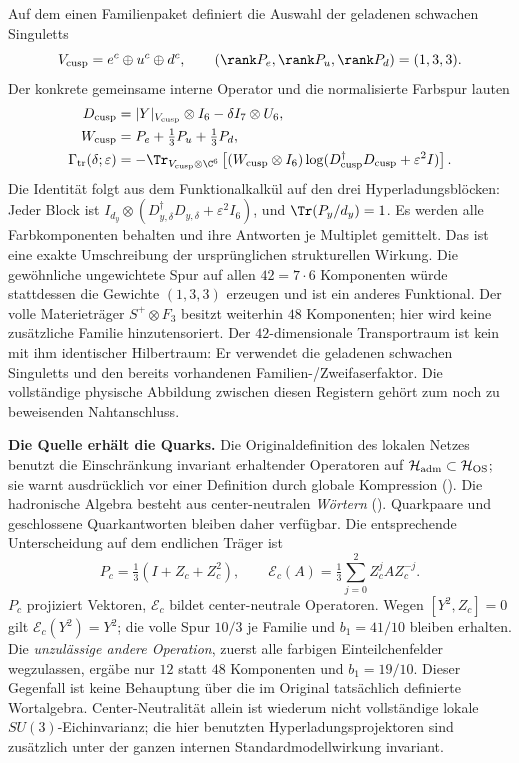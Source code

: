 Auf dem einen Familienpaket definiert die Auswahl der geladenen schwachen Singuletts
\[
V_{\rm cusp}=e^c\oplus u^c\oplus d^c,\qquad
(\rank P_e,\rank P_u,\rank P_d)=(1,3,3).
\]
Der konkrete gemeinsame interne Operator und die normalisierte Farbspur lauten
\begin{align}
D_{\rm cusp}&=|Y|_{V_{\rm cusp}}\otimes I_6-\delta I_7\otimes U_6,\\
W_{\rm cusp}&=P_e+\tfrac13P_u+\tfrac13P_d,\\
\Gamma_{\rm tr}(\delta;\varepsilon)
&=-\Tr_{V_{\rm cusp}\otimes\C^6}
\left[(W_{\rm cusp}\otimes I_6)
\log(D_{\rm cusp}^{\dagger}D_{\rm cusp}+\varepsilon^2I)\right].
\end{align}
Die Identität folgt aus dem Funktionalkalkül auf den drei Hyperladungsblöcken:
Jeder Block ist $I_{d_y}\otimes(D_{y,\delta}^{\dagger}D_{y,\delta}+\varepsilon^2I_6)$,
und $\Tr(P_y/d_y)=1$. Es werden alle Farbkomponenten behalten und ihre Antworten je Multiplet gemittelt.
Das ist eine exakte Umschreibung der ursprünglichen strukturellen Wirkung.
Die gewöhnliche ungewichtete Spur auf allen $42=7\cdot6$ Komponenten würde stattdessen die Gewichte $(1,3,3)$ erzeugen und ist ein anderes Funktional.
Der volle Materieträger $S^+\otimes F_3$ besitzt weiterhin $48$ Komponenten; hier wird keine zusätzliche Familie hinzutensoriert. Der $42$-dimensionale Transportraum ist kein mit ihm identischer Hilbertraum: Er verwendet die geladenen schwachen Singuletts und den bereits vorhandenen Familien-/Zweifaserfaktor. Die vollständige physische Abbildung zwischen diesen Registern gehört zum noch zu beweisenden Nahtanschluss.

\textbf{Die Quelle erhält die Quarks.} Die Originaldefinition des lokalen Netzes benutzt die Einschränkung invariant erhaltender Operatoren auf $\mathcal H_{\rm adm}\subset\mathcal H_{\rm OS}$; sie warnt ausdrücklich vor einer Definition durch globale Kompression
(). Die hadronische Algebra besteht aus center-neutralen \emph{Wörtern}
(). Quarkpaare und geschlossene Quarkantworten bleiben daher verfügbar.
Die entsprechende Unterscheidung auf dem endlichen Träger ist
\[
P_c=\tfrac13(I+Z_c+Z_c^2),\qquad
\mathcal E_c(A)=\tfrac13\sum_{j=0}^2 Z_c^j A Z_c^{-j}.
\]
$P_c$ projiziert Vektoren, $\mathcal E_c$ bildet center-neutrale Operatoren.
Wegen $[Y^2,Z_c]=0$ gilt $\mathcal E_c(Y^2)=Y^2$; die volle Spur $10/3$ je Familie und $b_1=41/10$ bleiben erhalten.
Die \emph{unzulässige andere Operation}, zuerst alle farbigen Einteilchenfelder wegzulassen, ergäbe nur $12$ statt $48$ Komponenten und $b_1=19/10$. Dieser Gegenfall ist keine Behauptung über die im Original tatsächlich definierte Wortalgebra.
Center-Neutralität allein ist wiederum nicht vollständige lokale $SU(3)$-Eichinvarianz; die hier benutzten Hyperladungsprojektoren sind zusätzlich unter der ganzen internen Standardmodellwirkung invariant.


